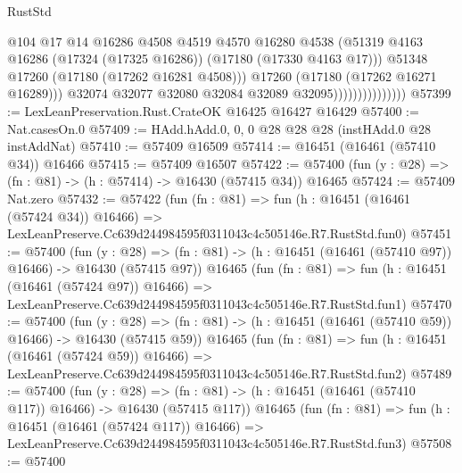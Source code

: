 \begin{lexlean}{RustStd}
\begin{coremodule}
                                      @104
                                      @17
                                      @14
                                      @16286
                                      @4508
                                      @4519
                                      @4570
                                      @16280
                                      @4538
                                      (@51319
                                        @4163
                                        @16286
                                        (@17324 (@17325 @16286))
                                        (@17180 (@17330 @4163 @17)))
                                      @51348
                                      @17260
                                      (@17180 (@17262 @16281 @4508)))
                                    @17260
                                    (@17180 (@17262 @16271 @16289)))
                                  @32074
                                  @32077
                                  @32080
                                  @32084
                                  @32089
                                  @32095)))))))))))))))
@57399 := LexLeanPreservation.Rust.CrateOK @16425 @16427 @16429
@57400 := Nat.casesOn.{0}
@57409 := HAdd.hAdd.{0, 0, 0} @28 @28 @28 (instHAdd.{0} @28 instAddNat)
@57410 := @57409 @16509
@57414 := @16451 (@16461 (@57410 @34)) @16466
@57415 := @57409 @16507
@57422 := @57400 (fun (y : @28) => (fn : @81) -> (h : @57414) -> @16430 (@57415 @34)) @16465
@57424 := @57409 Nat.zero
@57432 := @57422
    (fun (fn : @81) =>
    fun (h : @16451 (@16461 (@57424 @34)) @16466) =>
    LexLeanPreserve.Cc639d244984595f0311043c4c505146e.R7.RustStd.fun0)
@57451 := @57400
    (fun (y : @28) =>
    (fn : @81) -> (h : @16451 (@16461 (@57410 @97)) @16466) -> @16430 (@57415 @97))
    @16465
    (fun (fn : @81) =>
    fun (h : @16451 (@16461 (@57424 @97)) @16466) =>
    LexLeanPreserve.Cc639d244984595f0311043c4c505146e.R7.RustStd.fun1)
@57470 := @57400
    (fun (y : @28) =>
    (fn : @81) -> (h : @16451 (@16461 (@57410 @59)) @16466) -> @16430 (@57415 @59))
    @16465
    (fun (fn : @81) =>
    fun (h : @16451 (@16461 (@57424 @59)) @16466) =>
    LexLeanPreserve.Cc639d244984595f0311043c4c505146e.R7.RustStd.fun2)
@57489 := @57400
    (fun (y : @28) =>
    (fn : @81) -> (h : @16451 (@16461 (@57410 @117)) @16466) -> @16430 (@57415 @117))
    @16465
    (fun (fn : @81) =>
    fun (h : @16451 (@16461 (@57424 @117)) @16466) =>
    LexLeanPreserve.Cc639d244984595f0311043c4c505146e.R7.RustStd.fun3)
@57508 := @57400

\end{coremodule}
\end{lexlean}
